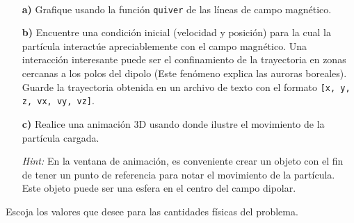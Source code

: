 \
\begin{itemize}
\item [\textbf{a)}] Grafique usando la función \texttt{quiver} de \matplotlib las 
líneas de campo magnético.
\item [\textbf{b)}] Encuentre una condición inicial (velocidad y posición) para
la cual la partícula interactúe apreciablemente con el campo magnético.
Una interacción interesante puede ser el confinamiento de la trayectoria en
zonas cercanas a los polos del dipolo (Este fenómeno explica las auroras 
boreales). Guarde la trayectoria obtenida en un archivo de texto con el formato
\texttt{[x, y, z, vx, vy, vz]}.  
\item[\textbf{c)}] Realice una animación 3D usando \mayavi donde ilustre el 
movimiento de la partícula cargada.

\textit{Hint:} En la ventana de animación, es conveniente crear un objeto
con el fin de tener un punto de referencia para notar el movimiento de la 
partícula. Este objeto puede ser una esfera en el centro del campo dipolar.

\end{itemize}

Escoja los valores que desee para las cantidades físicas del problema.

